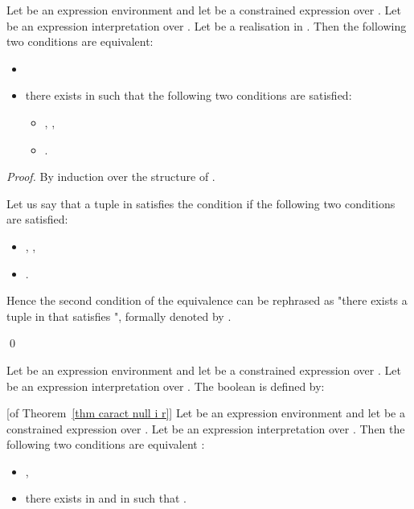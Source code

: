 \documentclass[a4paper]{llncs}
\begin{document}
  \begin{theorem}\label{thm caract null i r}
    Let  be an expression environment and let  be a constrained expression over . Let  be  an expression interpretation over . Let  be a realisation in . Then the  following two conditions are equivalent:
    \begin{itemize}
        \item 
        \item there exists  in  such that the  following two conditions are satisfied:
          \begin{itemize}
            \item ,   ,
            \item .
          \end{itemize}
     \end{itemize}
  \end{theorem}
  \begin{proof}
    By induction over the structure of .
    
    Let us say that a tuple  in  satisfies the condition  if the  following two conditions are satisfied:
          \begin{itemize}
            \item ,   ,
            \item .
          \end{itemize}
          
    Hence the second condition of the equivalence can be rephrased as "there exists a tuple  in  that satisfies ", formally denoted by .
            
    \qed
  \end{proof} 
  
  
 
  \begin{definition}[ Predicate]
    Let  be an expression environment and let  be a constrained expression over . Let  be  an expression interpretation over . The boolean  is defined by:
        
  \end{definition}
  
  \begin{corollary}\label{cor nullIE lien sat}[of Theorem~\ref{thm caract null i r}]
    Let  be an expression environment and let  be a constrained expression over . Let  be  an expression interpretation over . Then the  following two conditions are equivalent :
    \begin{itemize}
        \item ,
        \item there exists  in  and  in  such that .
     \end{itemize}
  \end{corollary}
  
\end{document}
